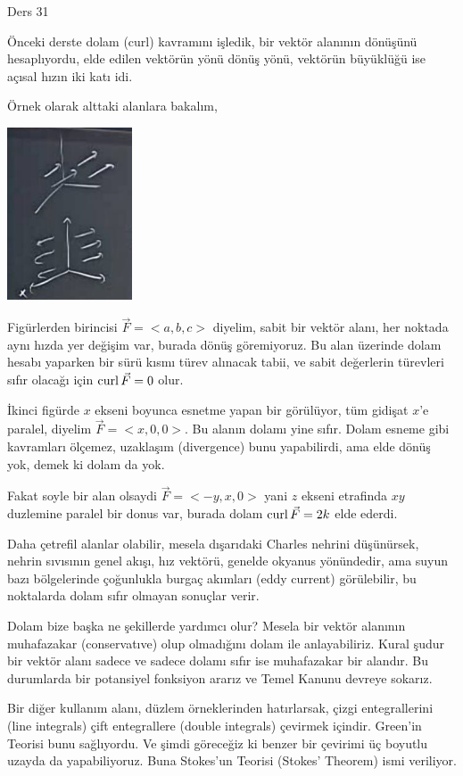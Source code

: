\documentclass[12pt,fleqn]{article}\usepackage{../../common}
\begin{document}
Ders 31

Önceki derste dolam (curl) kavramını işledik, bir vektör alanının dönüşünü
hesaplıyordu, elde edilen vektörün yönü dönüş yönü, vektörün büyüklüğü ise
açısal hızın iki katı idi.

Örnek olarak alttaki alanlara bakalım,

\includegraphics[width=10em]{calc_multi_31_01.jpg}

Figürlerden birincisi $\vec{F} = < a,b,c > $ diyelim, sabit bir vektör
alanı, her noktada aynı hızda yer değişim var, burada dönüş göremiyoruz.
Bu alan üzerinde dolam hesabı yaparken bir sürü kısmı türev alınacak tabii,
ve sabit değerlerin türevleri sıfır olacağı için $\operatorname{curl} \vec{F} = 0$ olur.

İkinci figürde $x$ ekseni boyunca esnetme yapan bir görülüyor, tüm gidişat $x$'e
paralel, diyelim $\vec{F} = < x, 0, 0 >$. Bu alanın dolamı yine sıfır.  Dolam
esneme gibi kavramları ölçemez, uzaklaşım (divergence) bunu yapabilirdi, ama
elde dönüş yok, demek ki dolam da yok.

Fakat soyle bir alan olsaydi $\vec{F} = < -y, x, 0 >$ yani $z$ ekseni etrafinda
$xy$ duzlemine paralel bir donus var, burada dolam $\operatorname{curl} \vec{F} = 2 k$ elde
ederdi.

Daha çetrefil alanlar olabilir, mesela dışarıdaki Charles nehrini düşünürsek,
nehrin sıvısının genel akışı, hız vektörü, genelde okyanus yönündedir, ama
suyun bazı bölgelerinde çoğunlukla burgaç akımları (eddy current) görülebilir,
bu noktalarda dolam sıfır olmayan sonuçlar verir.

Dolam bize başka ne şekillerde yardımcı olur? Mesela bir vektör alanının
muhafazakar (conservatıve) olup olmadığını dolam ile anlayabiliriz. Kural şudur
bir vektör alanı sadece ve sadece dolamı sıfır ise muhafazakar bir alandır.
Bu durumlarda bir potansiyel fonksiyon ararız ve Temel Kanunu devreye sokarız.

Bir diğer kullanım alanı, düzlem örneklerinden hatırlarsak, çizgi entegrallerini
(line integrals) çift entegrallere (double integrals) çevirmek içindir. Green'in
Teorisi bunu sağlıyordu. Ve şimdi göreceğiz ki benzer bir çevirimi üç boyutlu
uzayda da yapabiliyoruz. Buna Stokes'un Teorisi (Stokes' Theorem) ismi veriliyor.
\end{document}
